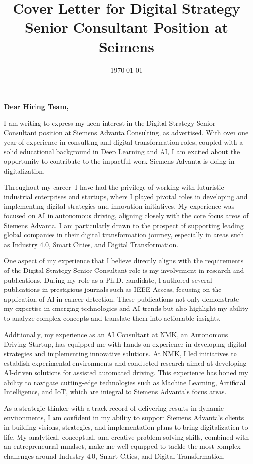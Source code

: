 \documentclass[11pt]{article}
\date{\today}
\title{Cover Letter for Digital Strategy Senior Consultant Position at Seimens}
\begin{document}
\maketitle
\textbf{Dear Hiring Team,}

I am writing to express my keen interest in the Digital Strategy Senior Consultant position at Siemens Advanta Consulting, as advertised. With over one year of experience in consulting and digital transformation roles, coupled with a solid educational background in Deep Learning and AI, I am excited about the opportunity to contribute to the impactful work Siemens Advanta is doing in digitalization.

Throughout my career, I have had the privilege of working with futuristic industrial enterprises and startups, where I played pivotal roles in developing and implementing digital strategies and innovation initiatives. My experience was focused on AI in autonomous driving, aligning closely with the core focus areas of Siemens Advanta. I am particularly drawn to the prospect of supporting leading global companies in their digital transformation journey, especially in areas such as Industry 4.0, Smart Cities, and Digital Transformation.

One aspect of my experience that I believe directly aligns with the requirements of the Digital Strategy Senior Consultant role is my involvement in research and publications. During my role as a Ph.D. candidate, I authored several publications in prestigious journals such as IEEE Access, focusing on the application of AI in cancer detection. These publications not only demonstrate my expertise in emerging technologies and AI trends but also highlight my ability to analyze complex concepts and translate them into actionable insights.

Additionally, my experience as an AI Consultant at NMK, an Autonomous Driving Startup, has equipped me with hands-on experience in developing digital strategies and implementing innovative solutions. At NMK, I led initiatives to establish experimental environments and conducted research aimed at developing AI-driven solutions for assisted automated driving. This experience has honed my ability to navigate cutting-edge technologies such as Machine Learning, Artificial Intelligence, and IoT, which are integral to Siemens Advanta's focus areas.

As a strategic thinker with a track record of delivering results in dynamic environments, I am confident in my ability to support Siemens Advanta's clients in building visions, strategies, and implementation plans to bring digitalization to life. My analytical, conceptual, and creative problem-solving skills, combined with an entrepreneurial mindset, make me well-equipped to tackle the most complex challenges around Industry 4.0, Smart Cities, and Digital Transformation.
\end{document}
